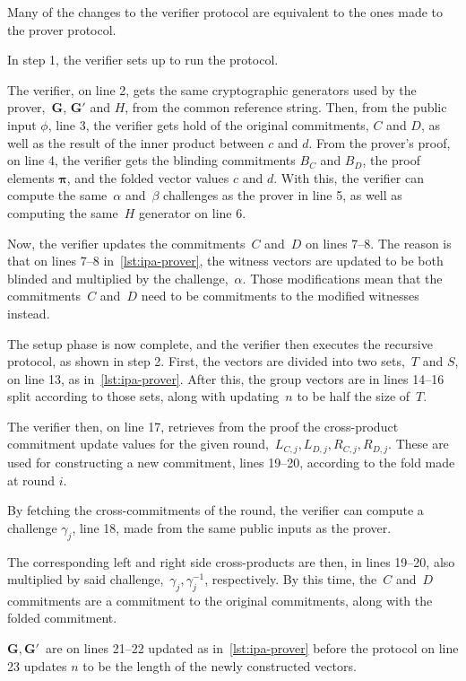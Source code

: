 Many of the changes to the verifier protocol are equivalent to the ones made to the prover protocol.

In step 1, the verifier sets up to run the protocol.

The verifier, on line 2, gets the same cryptographic generators used by the prover,~$\mathbf{G}$, $\mathbf{G}'$ and $H$, from the common reference string.
Then, from the public input $\phi$, line 3, the verifier gets hold of the original commitments, $C$ and $D$, as well as the result of the inner product between $c$ and $d$.
From the prover's proof, on line 4, the verifier gets the blinding commitments $B_C$ and $B_D$, the proof elements $\mathbf{\pi}$, and the folded vector values $c$ and $d$.
With this, the verifier can compute the same~$\alpha$ and~$\beta$ challenges as the prover in line 5, as well as computing the same~$H$ generator on line 6.

Now, the verifier updates the commitments~$C$ and~$D$ on lines 7--8.
The reason is that on lines 7--8 in~\autoref{lst:ipa-prover}, the witness vectors are updated to be both blinded and multiplied by the challenge,~$\alpha$.
Those modifications mean that the commitments~$C$ and~$D$ need to be commitments to the modified witnesses instead.

The setup phase is now complete, and the verifier then executes the recursive protocol, as shown in step 2.
First, the vectors are divided into two sets,~$T$ and $S$, on line 13, as in~\autoref{lst:ipa-prover}.
After this, the group vectors are in lines 14--16 split according to those sets, along with updating~$n$ to be half the size of~$T$.

The verifier then, on line 17, retrieves from the proof the cross-product commitment update values for the given round,~$L_{C,j},L_{D,j},R_{C,j},R_{D,j}$.
These are used for constructing a new commitment, lines 19--20, according to the fold made at round $i$.

By fetching the cross-commitments of the round, the verifier can compute a challenge $\gamma_j$, line 18, made from the same public inputs as the prover.

The corresponding left and right side cross-products are then, in lines 19--20, also multiplied by said challenge,~$\gamma_j,\gamma_j^{-1}$, respectively.
By this time, the~$C$ and~$D$ commitments are a commitment to the original commitments, along with the folded commitment.

$\mathbf{G,G'}$~are on lines 21--22 updated as in~\autoref{lst:ipa-prover} before the protocol on line 23 updates $n$ to be the length of the newly constructed vectors.

